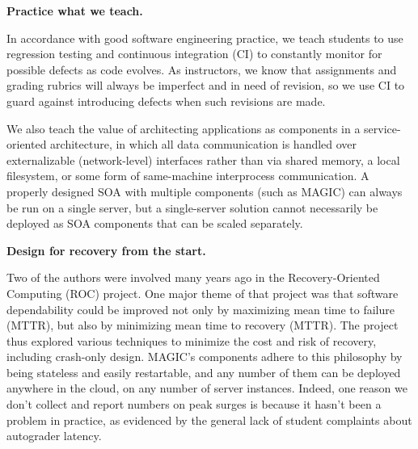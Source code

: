 \textbf{Practice what we teach.}

In accordance with good software engineering practice, we teach students
to use regression testing and continuous integration (CI) to constantly
monitor for possible defects as code evolves.  As instructors, we know
that assignments and grading rubrics will always be imperfect and in
need of revision, so we use CI to guard against introducing defects when
such revisions are made.

We also teach the value of architecting applications as components in a
service-oriented architecture, in which all data communication is
handled over externalizable (network-level) interfaces rather than via
shared memory, a local filesystem, or some form of same-machine
interprocess communication.
A properly designed SOA with multiple components (such as MAGIC) can
always be run on a single server, but a single-server solution
cannot necessarily be deployed as SOA components that can be scaled
separately.

\textbf{Design for recovery from the start.}

Two of the authors were involved many years ago in the Recovery-Oriented
Computing (ROC) project.
One major theme of that project was that software dependability could be
improved not only by maximizing mean time to failure (MTTR), but also by
minimizing mean time to recovery (MTTR).
The project thus explored various techniques to minimize the cost and
risk of recovery, including crash-only design.
MAGIC's components adhere to this philosophy by being stateless and
easily restartable, and any number of them can be deployed anywhere in
the cloud, on any number of server instances.
Indeed, one reason we don't collect and report numbers on peak surges is
because it hasn't been a problem in practice, as evidenced by the
general lack of student complaints about autograder latency.


